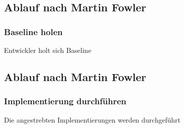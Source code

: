 \documentclass[hyperref={pdfpagelabels=false}]{beamer}
\begin{document}
\subsection{Ablauf nach Martin Fowler}
\begin{frame} [t]
\frametitle{Baseline holen}
\begin{figure}[h]
  \centering
\end{figure}
\vspace{0.5cm} 
Entwickler holt sich Baseline
\end{frame}

\subsection{Ablauf nach Martin Fowler}
\begin{frame} [t]
\frametitle{Implementierung durchführen}
\begin{figure}[h]
  \centering
\end{figure}
\vspace{0.5cm} 
Die angestrebten Implementierungen werden durchgeführt
\end{frame}
\end{document}
